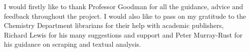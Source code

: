 I would firstly like to thank Professor Goodman for all the guidance, advice and feedback throughout the project. I would also like to pass on my gratitude to the Chemistry Department librarians for their help with academic publishers, Richard Lewis for his many suggestions and support and Peter Murray-Rust for his guidance on scraping and textual analysis.